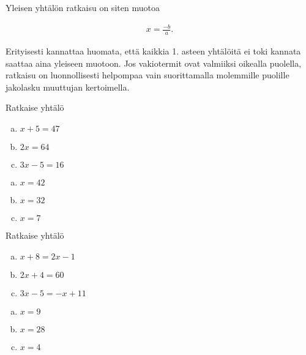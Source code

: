 Yleisen yhtälön ratkaisu on siten muotoa

\begin{align*}
  x = \frac{-b}{a}.
\end{align*}

Erityisesti kannattaa huomata, että kaikkia 1. asteen yhtälöitä ei toki
kannata saattaa aina yleiseen muotoon. Jos vakiotermit ovat valmiiksi oikealla
puolella, ratkaisu on luonnollisesti helpompaa vain suorittamalla
molemmille puolille jakolasku muuttujan kertoimella.

\Harjoitustehtavat

\begin{tehtava}
    Ratkaise yhtälö
    \begin{enumerate}[(a)]
        \item $x + 5 = 47$
        \item $2x = 64$
        \item $3x - 5 = 16$
    \end{enumerate}
    \begin{vastaus}
        \begin{enumerate}[(a)]
            \item $x = 42$
            \item $x = 32$
            \item $x = 7$
        \end{enumerate}
    \end{vastaus}
\end{tehtava}

\begin{tehtava}
    Ratkaise yhtälö
    \begin{enumerate}[(a)]
        \item $x + 8 = 2x - 1$
        \item $2x + 4 = 60$
        \item $3x - 5 = -x + 11$
    \end{enumerate}
    \begin{vastaus}
        \begin{enumerate}[(a)]
            \item $x = 9$
            \item $x = 28$
            \item $x = 4$
        \end{enumerate}
    \end{vastaus}
\end{tehtava}

